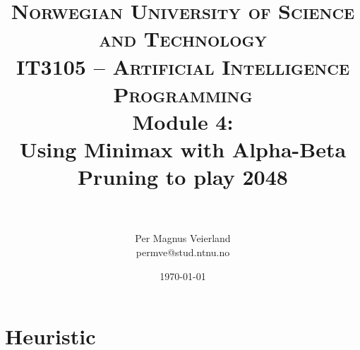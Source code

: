 

\title{	
\normalfont \normalsize 
\textsc{Norwegian University of Science and Technology\\IT3105 -- Artificial Intelligence Programming}
\horrule{0.5pt} \\[0.4cm]
\huge Module 4:\\ Using Minimax with Alpha-Beta Pruning to play 2048\\
\horrule{2pt} \\[0.5cm]
}

\author{Per Magnus Veierland\\permve@stud.ntnu.no}

\date{\normalsize\today}



\maketitle

\section*{Heuristic}

\begin{tabular}

\end{tabular}



